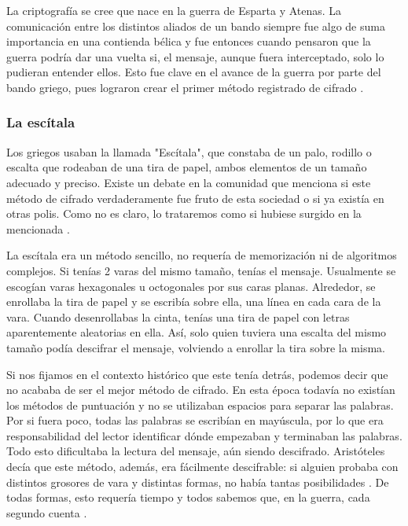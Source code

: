 La criptografía se cree que nace en la guerra de Esparta y Atenas. La comunicación entre los distintos aliados de un bando siempre fue algo de suma importancia en una contienda bélica y fue entonces cuando pensaron que la guerra podría dar una vuelta si, el mensaje, aunque fuera interceptado, solo lo pudieran entender ellos. Esto fue clave en el avance de la guerra por parte del bando griego, pues lograron crear el primer método registrado de cifrado \cite{national_geographic_escitala}.

\subsubsection {La escítala}

Los griegos usaban la llamada "Escítala", que constaba de un palo, rodillo o escalta que rodeaban de una tira de papel, ambos elementos de un tamaño adecuado y preciso. Existe un debate en la comunidad que menciona si este método de cifrado verdaderamente fue fruto de esta sociedad o si ya existía en otras polis. Como no es claro, lo trataremos como si hubiese surgido en la mencionada \cite{national_geographic_escitala}.

La escítala era un método sencillo, no requería de memorización ni de algoritmos complejos. Si tenías 2 varas del mismo tamaño, tenías el mensaje. Usualmente se escogían varas hexagonales u octogonales por sus caras planas. Alrededor, se enrollaba la tira de papel y se escribía sobre ella, una línea en cada cara de la vara. Cuando desenrollabas la cinta, tenías una tira de papel con letras aparentemente aleatorias en ella. Así, solo quien tuviera una escalta del mismo tamaño podía descifrar el mensaje, volviendo a enrollar la tira sobre la misma.

Si nos fijamos en el contexto histórico que este tenía detrás, podemos decir que no acababa de ser el mejor método de cifrado. En esta época todavía no existían los métodos de puntuación y no se utilizaban espacios para separar las palabras. Por si fuera poco, todas las palabras se escribían en mayúscula, por lo que era responsabilidad del lector identificar dónde empezaban y terminaban las palabras. Todo esto dificultaba la lectura del mensaje, aún siendo descifrado. Aristóteles decía que este método, además, era fácilmente descifrable: si alguien probaba con distintos grosores de vara y distintas formas, no había tantas posibilidades \cite{national_geographic_escitala}. De todas formas, esto requería tiempo y todos sabemos que, en la guerra, cada segundo cuenta \cite{national_geographic_escitala}.

